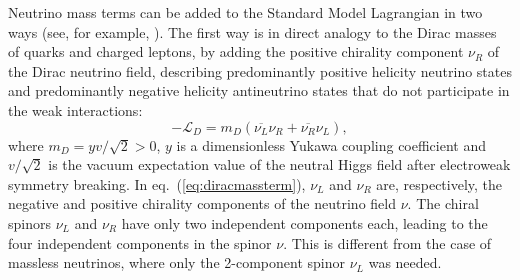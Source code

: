 Neutrino mass terms can be added to the Standard Model Lagrangian in two ways (see, for example, \cite{Giunti:2003qt}). The first way is in direct analogy to the Dirac masses of quarks and charged leptons, by adding the positive chirality component $\nu_R$ of the Dirac neutrino field, describing predominantly positive helicity neutrino states and predominantly negative helicity antineutrino states that do not participate in the weak interactions:
%
\begin{equation}
\label{eq:diracmassterm}
-\mathcal{L}_D=m_D(\overline{\nu_L}\nu_R+\overline{\nu_R}\nu_L),
\end{equation}
%
where $m_D=y v/\sqrt{2}>0$, $y$ is a dimensionless Yukawa coupling coefficient and $v/\sqrt{2}$ is the vacuum expectation value of the neutral Higgs field after electroweak symmetry breaking. In eq.~(\ref{eq:diracmassterm}), $\nu_L$ and $\nu_R$ are, respectively, the negative and positive chirality components of the neutrino field $\nu$. The chiral spinors $\nu_L$ and $\nu_R$ have only two independent components each, leading to the four independent components in the spinor $\nu$. This is different from the case of massless neutrinos, where only the 2-component spinor $\nu_L$ was needed.

